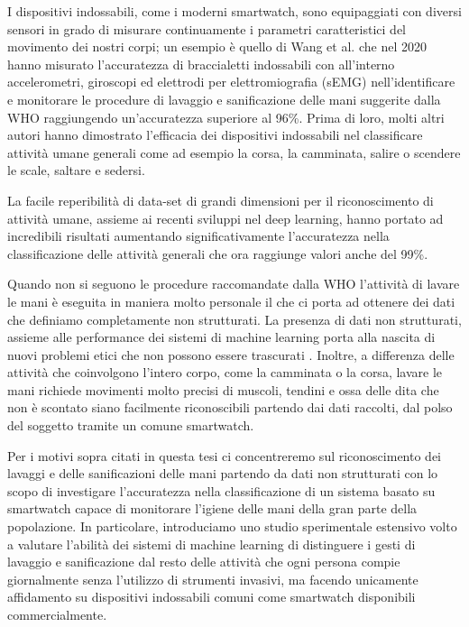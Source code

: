 I dispositivi indossabili, come i moderni smartwatch, sono equipaggiati con diversi sensori in grado di misurare continuamente i parametri caratteristici del movimento dei nostri corpi; un esempio è quello di Wang et al.\cite{wang2020accurate} che nel 2020 hanno misurato l'accuratezza di braccialetti indossabili con all'interno accelerometri, giroscopi ed elettrodi per elettromiografia (sEMG) nell'identificare e monitorare le procedure di lavaggio e sanificazione delle mani suggerite dalla WHO raggiungendo un'accuratezza superiore al 96\%.
Prima di loro, molti altri autori hanno dimostrato l'efficacia dei dispositivi indossabili nel classificare attività umane generali come ad esempio la corsa, la camminata, salire o scendere le scale, saltare e sedersi\cite{zhang2013human}\cite{sztyler2016body}\cite{sztyler2017position}\cite{bhat2018online}\cite{koping2018general}\cite{lattanzi2022exploring}.

La facile reperibilità di data-set di grandi dimensioni per il riconoscimento di attività umane, assieme ai recenti sviluppi nel deep learning, hanno portato ad incredibili risultati aumentando significativamente l'accuratezza nella classificazione delle attività generali che ora raggiunge valori anche del 99\%\cite{cheng2010active}\cite{singh2017convolutional}\cite{hassan2018robust}\cite{hou2020study}.

Quando non si seguono le procedure raccomandate dalla WHO l'attività di lavare le mani è eseguita in maniera molto personale il che ci porta ad ottenere dei dati che definiamo completamente non strutturati.
La presenza di dati non strutturati, assieme alle performance dei sistemi di machine learning porta alla nascita di nuovi problemi etici che non possono essere trascurati \cite{muller2021ten}. Inoltre, a differenza delle attività che coinvolgono l'intero corpo, come la camminata o la corsa, lavare le mani richiede movimenti molto precisi di muscoli, tendini e ossa delle dita che non è scontato siano facilmente riconoscibili partendo dai dati raccolti, dal polso del soggetto tramite un comune smartwatch. 

Per i motivi sopra citati in questa tesi ci concentreremo sul riconoscimento dei lavaggi e delle sanificazioni delle mani partendo da dati non strutturati con lo scopo di investigare l'accuratezza nella 
classificazione di un sistema basato su smartwatch capace di monitorare l'igiene delle mani della gran parte della popolazione. In particolare, introduciamo uno studio sperimentale estensivo volto a valutare l'abilità dei sistemi di machine learning di distinguere i gesti di lavaggio e sanificazione dal resto delle attività che ogni persona compie giornalmente senza l'utilizzo di strumenti invasivi, ma facendo unicamente affidamento su dispositivi indossabili comuni come smartwatch disponibili commercialmente.

